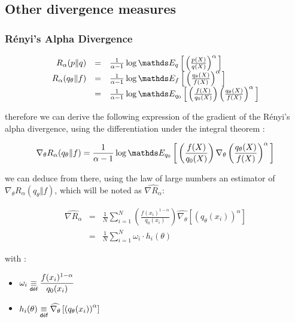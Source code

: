 \subsection{Other divergence measures}

\subsubsection{Rényi's Alpha Divergence}

$$
\begin{array}{rcl}
	R_\alpha(p \Vert q) &=& \frac 1 {\alpha - 1} \log \esperanceloi q { \left( \frac {p(X)} {q(X)} \right)^\alpha }
\\
R_\alpha(q_\theta \Vert f) &=& 
\frac 1 {\alpha - 1} \log \esperanceloi f { \left( \frac {q_\theta(X)} {f(X)} \right)^\alpha }
\\
&=& 
\frac {1}{\alpha - 1} \log \esperanceloi{ q_0 }{ \left( \frac{f(X)}{q_0(X)} \right) \left( \frac {q_\theta(X)} {f(X)} \right)^\alpha }
\end{array}
$$

therefore we can derive the following expression of the gradient of the Rényi's alpha divergence, using the differentiation under the integral theorem :


$$\nabla_\theta R_\alpha(q_\theta \Vert f) = \frac {1}{\alpha - 1} \log \esperanceloi{ q_0 }{ \left( \frac{f(X)}{q_0(X)} \right) \nabla_\theta \left( \frac {q_\theta(X)} {f(X)} \right)^\alpha }$$

we can deduce from there, using the law of large numbers an estimator of $\nabla_\theta R_\alpha(q_\theta \Vert f)$, which will be noted as $\widehat{\nabla R_\alpha}$:

\[
	\begin{array}{rcl}
		
	\widehat{\nabla R_\alpha} &=& \displaystyle{\frac 1 N \sum\limits_{i=1}^N  \left( \frac{f(x_i)^{1-\alpha}}{q_0(x_i)} \right) \widehat{\nabla_\theta }\left[\left( {q_\theta(x_i)} \right)^\alpha\right]}
		\\
	&=& \displaystyle{\frac 1 N \sum\limits_{i=1}^N \omega_i \cdot h_i(\theta)}
\end{array}
\]

	with :
	\begin{itemize}
	
		\item $\displaystyle{\omega_i \isdef \frac{f(x_i)^{1-\alpha}}{q_0(x_i)}}$
		\item $\displaystyle{h_i(\theta) \isdef \widehat{\nabla_\theta }\left[\left( {q_\theta(x_i)} \right)^\alpha\right]}$
	\end{itemize}


